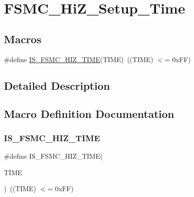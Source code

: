 \hypertarget{group___f_s_m_c___hi_z___setup___time}{}\section{F\+S\+M\+C\+\_\+\+Hi\+Z\+\_\+\+Setup\+\_\+\+Time}
\label{group___f_s_m_c___hi_z___setup___time}
\subsection*{Macros}
\begin{DoxyCompactItemize}
\item 
\#define \mbox{\hyperlink{group___f_s_m_c___hi_z___setup___time_gaeb6295e8cc1a524f060c5e780f868033}{I\+S\+\_\+\+F\+S\+M\+C\+\_\+\+H\+I\+Z\+\_\+\+T\+I\+ME}}(T\+I\+ME)~((T\+I\+ME) $<$= 0x\+F\+F)
\end{DoxyCompactItemize}


\subsection{Detailed Description}


\subsection{Macro Definition Documentation}
\mbox{\label{group___f_s_m_c___hi_z___setup___time_gaeb6295e8cc1a524f060c5e780f868033}} 
\subsubsection{\texorpdfstring{IS\_FSMC\_HIZ\_TIME}{IS\_FSMC\_HIZ\_TIME}}
{\footnotesize\ttfamily \#define I\+S\+\_\+\+F\+S\+M\+C\+\_\+\+H\+I\+Z\+\_\+\+T\+I\+ME(\begin{DoxyParamCaption}\item[{}]{T\+I\+ME }\end{DoxyParamCaption})~((T\+I\+ME) $<$= 0x\+F\+F)}

